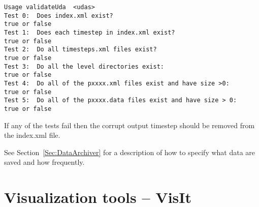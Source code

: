 \begin{Verbatim}
Usage validateUda  <udas>
Test 0:  Does index.xml exist?                                        true or false
Test 1:  Does each timestep in index.xml exist?                       true or false
Test 2:  Do all timesteps.xml files exist?                            true or false
Test 3:  Do all the level directories exist:                          true or false
Test 4:  Do all of the pxxxx.xml files exist and have size >0:        true or false
Test 5:  Do all of the pxxxx.data files exist and have size > 0:      true or false
\end{Verbatim}

If any of the tests fail then the corrupt output timestep should be removed from the index.xml file.


See Section~\ref{Sec:DataArchiver} for a description of how to specify
what data are saved and how frequently.









\chapter{Visualization tools -- VisIt}

